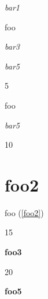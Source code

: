 
\def\mytitle{HTML Blocks}


\emph{bar1}

foo

\emph{bar3}


\emph{bar5}

5

foo

\emph{bar5}

10

\part{foo2}
\label{foo2}

foo (\autoref{foo2})

15

\textbf{foo3}

20

\textbf{foo5}


